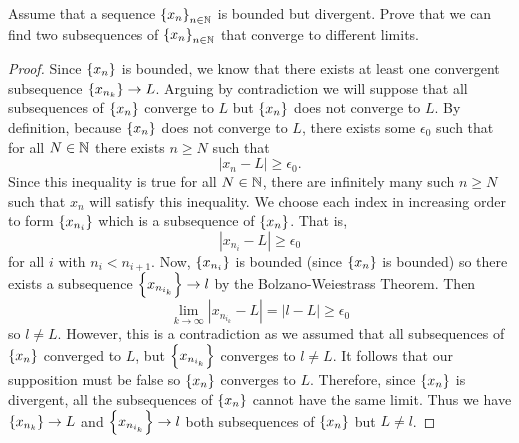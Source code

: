 \documentclass{exam}
\begin{document}
    Assume that a sequence $\left\{x_n \right\}_{n \in \mathbb N}$ is bounded but divergent. Prove that we can find two subsequences of $\left\{x_n \right\}_{n \in \mathbb N}$ that converge to different limits.
    \begin{proof}
        Since $\left\{x_n \right\}$ is bounded, we know that there exists at least one convergent subsequence $\left\{x_{n_{k}} \right\} \to L$. Arguing by contradiction we will suppose that all subsequences of $\left\{x_n \right\}$ converge to $L$ but $\left\{x_n \right\}$ does not converge to $L$. By definition, because $\left\{x_n \right\}$ does not converge to $L$, there exists some $\epsilon_0$ such that for all $N \in \mathbb N$ there exists $n \geq N$ such that 
        \[
            |x_n - L| \geq \epsilon_0.
        \]
        Since this inequality is true for all $N \in \mathbb N$, there are infinitely many such $n \geq N$ such that $x_n$ will satisfy this inequality. We choose each index in increasing order to form $\left\{x_{n_{i}} \right\}$ which is a subsequence of $\left\{x_{n} \right\}$. That is, 
        \[
            |x_{n_{i}} - L| \geq \epsilon_0
        \]
        for all $i$ with $n_i < n_{i+1}$. Now, $\left\{x_{n_{i}} \right\}$ is bounded (since $\left\{x_n \right\}$ is bounded) so there exists a subsequence $\left\{x_{n_{i_{k}}} \right\} \to l$ by the Bolzano-Weiestrass Theorem. Then 
        \[
            \lim_{k\to\infty} |x_{n_{i_{k}}} - L| = |l - L| \geq \epsilon_0 
        \] 
        so $l \neq L$. However, this is a contradiction as we assumed that all subsequences of $\left\{x_n \right\}$ converged to $L$, but $\left\{x_{n_{i_{k}}} \right\}$ converges to $l \neq L$. It follows that our supposition must be false so $\left\{x_{n} \right\}$ converges to $L$. Therefore, since $\left\{x_{n} \right\}$ is divergent, all the subsequences of $\left\{x_{n} \right\}$ cannot have the same limit. Thus we have $\left\{x_{n_{k}} \right\} \to L$ and $\left\{x_{n_{i_{k}}} \right\} \to l$ both subsequences of $\left\{x_{n} \right\}$ but $L \neq l$.
    \end{proof}
\end{document}

